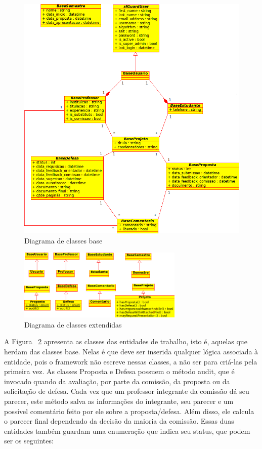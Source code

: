 \begin{figure}[htbp]
\centering
\includegraphics[width=1\textwidth]{fig/uml_classes_base.png}
\caption{Diagrama de classes base}
\label{fig:diag_classes_base}
\end{figure}

\begin{figure}[htbp]
\centering
\includegraphics[width=0.7\textwidth]{fig/uml_classes_principais.png}
\caption{Diagrama de classes extendidas}
\label{fig:diag_classes_principais}
\end{figure}

A Figura ~\ref{fig:diag_classes_principais} apresenta as classes das entidades de trabalho, 
isto é, aquelas que herdam das classes base. Nelas é que deve ser inserida qualquer lógica associada
à entidade, pois o framework não escreve nessas classes, a não ser para criá-las pela primeira vez.
As classes Proposta e Defesa possuem o método audit, que é invocado quando da avaliação, por parte da comissão,
da proposta ou da solicitação de defesa. Cada vez que um professor integrante da comissão dá seu parecer,
este método salva as informações do integrante, seu parecer e um possível comentário feito por ele
sobre a proposta/defesa. Além disso, ele calcula o parecer final dependendo da decisão da maioria 
da comissão. Essas duas entidades também guardam uma enumeração que indica seu status, que podem ser os
seguintes:

